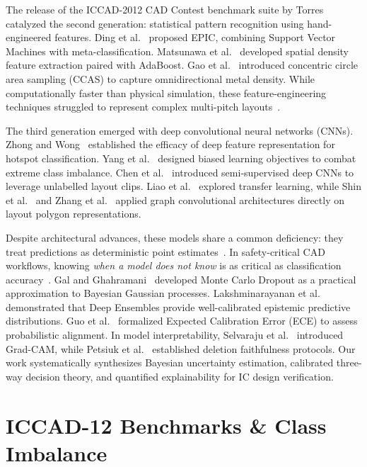 \documentclass[conference]{IEEEtran}
\begin{document}
The release of the ICCAD-2012 CAD Contest benchmark suite by Torres~\cite{torres2012iccad} catalyzed the second generation: statistical pattern recognition using hand-engineered features. Ding et al.~\cite{ding2012epic} proposed EPIC, combining Support Vector Machines with meta-classification. Matsunawa et al.~\cite{matsunawa2015new} developed spatial density feature extraction paired with AdaBoost. Gao et al.~\cite{gao2013concentric} introduced concentric circle area sampling (CCAS) to capture omnidirectional metal density. While computationally faster than physical simulation, these feature-engineering techniques struggled to represent complex multi-pitch layouts~\cite{ye2019lithography}.

The third generation emerged with deep convolutional neural networks (CNNs). Zhong and Wong~\cite{zhong2016deep} established the efficacy of deep feature representation for hotspot classification. Yang et al.~\cite{yang2017imbalance} designed biased learning objectives to combat extreme class imbalance. Chen et al.~\cite{chen2020semi} introduced semi-supervised deep CNNs to leverage unlabelled layout clips. Liao et al.~\cite{liao2022lithography} explored transfer learning, while Shin et al.~\cite{shin2021machine} and Zhang et al.~\cite{zhang2021robust} applied graph convolutional architectures directly on layout polygon representations. 

Despite architectural advances, these models share a common deficiency: they treat predictions as deterministic point estimates~\cite{abdar2021review}. In safety-critical CAD workflows, knowing \textit{when a model does not know} is as critical as classification accuracy~\cite{kendall2017uncertainties}. Gal and Ghahramani~\cite{gal2016dropout} developed Monte Carlo Dropout as a practical approximation to Bayesian Gaussian processes. Lakshminarayanan et al.~\cite{lakshminarayanan2017simple} demonstrated that Deep Ensembles provide well-calibrated epistemic predictive distributions. Guo et al.~\cite{guo2017calibration} formalized Expected Calibration Error (ECE) to assess probabilistic alignment. In model interpretability, Selvaraju et al.~\cite{selvaraju2017grad} introduced Grad-CAM, while Petsiuk et al.~\cite{petsiuk2018rise} established deletion faithfulness protocols. Our work systematically synthesizes Bayesian uncertainty estimation, calibrated three-way decision theory, and quantified explainability for IC design verification.

\section{ICCAD-12 Benchmarks \& Class Imbalance}
\end{document}
